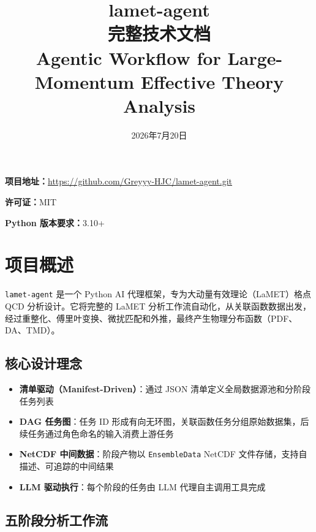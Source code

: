\documentclass[12pt,a4paper]{ctexart}
\title{{\Huge\bfseries lamet-agent}\\[4pt]
       {\large 完整技术文档}\\[4pt]
       {\normalsize Agentic Workflow for Large-Momentum Effective Theory Analysis}}
\author{}
\date{2026年7月20日}
\begin{document}
\maketitle
\thispagestyle{empty}

\vspace{2cm}
\begin{center}
\begin{tcolorbox}[width=0.85\textwidth,boxrule=0.8pt,colback=blue!3!white,colframe=blue!40!black]
\centering
\textbf{项目地址：}\url{https://github.com/Greyyy-HJC/lamet-agent.git}

\textbf{许可证：}MIT

\textbf{Python 版本要求：}3.10+
\end{tcolorbox}
\end{center}

\newpage
\tableofcontents
\newpage

\section{项目概述}

\texttt{lamet-agent} 是一个 Python AI 代理框架，专为大动量有效理论（LaMET）格点 QCD 分析设计。它将完整的 LaMET 分析工作流自动化，从关联函数数据出发，经过重整化、傅里叶变换、微扰匹配和外推，最终产生物理分布函数（PDF、DA、TMD）。

\subsection{核心设计理念}

\begin{itemize}[itemsep=4pt]
    \item \textbf{清单驱动（Manifest-Driven）}：通过 JSON 清单定义全局数据源池和分阶段任务列表
    \item \textbf{DAG 任务图}：任务 ID 形成有向无环图，关联函数任务分组原始数据集，后续任务通过角色命名的输入消费上游任务
    \item \textbf{NetCDF 中间数据}：阶段产物以 \texttt{EnsembleData} NetCDF 文件存储，支持自描述、可追踪的中间结果
    \item \textbf{LLM 驱动执行}：每个阶段的任务由 LLM 代理自主调用工具完成
\end{itemize}

\subsection{五阶段分析工作流}
\end{document}
